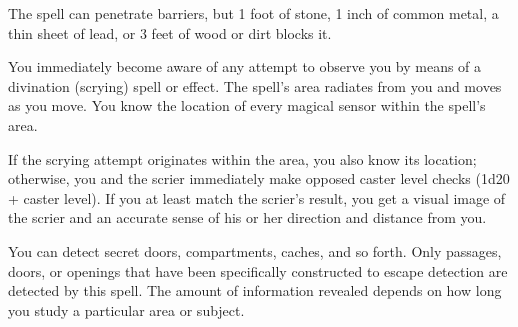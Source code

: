\begin{multicols}{2}
\begin{small}
\smallskip\noindent The spell can penetrate barriers, but 1 foot of stone, 1 inch of common metal, a thin sheet of lead, or 3 feet of wood or dirt blocks it.

\noindent You immediately become aware of any attempt to observe you by means of a divination (scrying) spell or effect. The spell's area radiates from you and moves as you move. You know the location of every magical sensor within the spell's area.

\smallskip\noindent If the scrying attempt originates within the area, you also know its location; otherwise, you and the scrier immediately make opposed caster level checks (1d20 + caster level). If you at least match the scrier's result, you get a visual image of the scrier and an accurate sense of his or her direction and distance from you.


\noindent You can detect secret doors, compartments, caches, and so forth. Only passages, doors, or openings that have been specifically constructed to escape detection are detected by this spell. The amount of information revealed depends on how long you study a particular area or subject.



\end{small}
\end{multicols}
